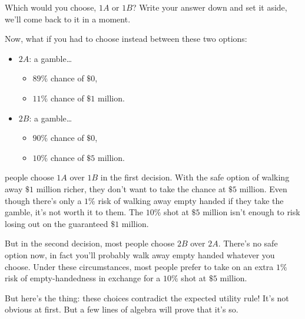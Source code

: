 \documentclass[justified]{tufte-book}
\providecommand{\tightlist}{%
  \setlength{\itemsep}{0pt}\setlength{\parskip}{0pt}}
\theoremstyle{definition}
\theoremstyle{definition}
\theoremstyle{definition}
\theoremstyle{remark}
\begin{document}
Which would you choose, \(1A\) or \(1B\)? Write your answer down and set
it aside, we'll come back to it in a moment.

Now, what if you had to choose instead between these two options:

\begin{itemize}
\tightlist
\item
  \(2A\): a gamble\ldots{}

  \begin{itemize}
  \tightlist
  \item
    \(89\%\) chance of \(\$0\),
  \item
    \(11\%\) chance of \(\$1\) million.
  \end{itemize}
\item
  \(2B\): a gamble\ldots{}

  \begin{itemize}
  \tightlist
  \item
    \(90\%\) chance of \(\$0\),
  \item
    \(10\%\) chance of \(\$5\) million.
  \end{itemize}
\end{itemize}

 people choose \(1A\) over \(1B\) in the first
decision. With the safe option of walking away \(\$1\) million richer,
they don't want to take the chance at \(\$5\) million. Even though
there's only a \(1\%\) risk of walking away empty handed if they take
the gamble, it's not worth it to them. The \(10\%\) shot at \(\$5\)
million isn't enough to risk losing out on the guaranteed \(\$1\)
million.

But in the second decision, most people choose \(2B\) over \(2A\).
There's no safe option now, in fact you'll probably walk away empty
handed whatever you choose. Under these circumstances, most people
prefer to take on an extra \(1\%\) risk of empty-handedness in exchange
for a \(10\%\) shot at \(\$5\) million.

But here's the thing: these choices contradict the expected utility
rule! It's not obvious at first. But a few lines of algebra will prove
that it's so.
\end{document}
